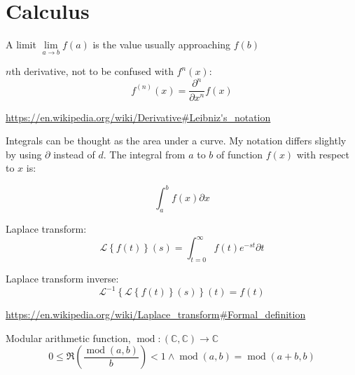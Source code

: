 \documentclass[]{article}
\DeclareMathOperator{\md}{mod}
\newcommand{\pqty}[1]{{\left(#1\right)}}
\newcommand{\Bqty}[1]{{\left\{#1\right\}}}
\newcommand{\laplace}[1]{\mathcal{L}\Bqty{#1}\pqty{s}}
\newcommand{\laplaceInv}[1]{\mathcal{L}^{-1}\Bqty{#1}\pqty{t}}
\newcommand{\pdiff}[2]{\frac{\partial^{#2}}{\partial #1^{#2}}}
\numberwithin{equation}{section}
\begin{document}
	\section{Calculus}
	A limit \(\lim\limits_{a\to b}f\pqty{a}\) is the value usually approaching \(f\pqty{b}\)
	
	\(n\)th derivative, not to be confused with \(f^{n}\pqty{x}\):
	\begin{equation}
	f^{(n)}\pqty{x}
	=
	\pdiff{x}{n}f\pqty{x}
	\end{equation}
	
	\url{https://en.wikipedia.org/wiki/Derivative#Leibniz's_notation}
	
	Integrals can be thought as the area under a curve. My notation differs slightly by using \(\partial\) instead of \(d\). The integral from \(a\) to \(b\) of function \(f\pqty{x}\) with respect to \(x\) is:
	
	
	\begin{equation}
	\int_{a}^{b} f\pqty{x}\partial x
	\end{equation}
	
	Laplace transform:
	\begin{equation}
	\laplace{f\pqty{t}}=
	\int_{t=0}^{\infty}f\pqty{t}e^{-st}\partial t
	\end{equation}
	
	Laplace transform inverse:
	\begin{equation}
	\laplaceInv{\laplace{f\pqty{t}}}=f\pqty{t}
	\end{equation}
	
	\url{https://en.wikipedia.org/wiki/Laplace_transform#Formal_definition}
	
	Modular arithmetic function, $\md:\pqty{\mathbb{C},\mathbb{C}}\rightarrow\mathbb{C}$
	\begin{equation}
	0\leq\Re\pqty{\frac{\md\pqty{a,b}}{b}}<1
	\land
	\md\pqty{a,b}=\md\pqty{a+b,b}
	\end{equation}
	
\end{document}
